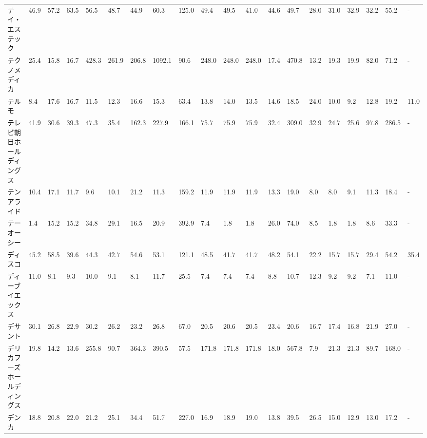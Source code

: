 \begin{tabular}{llllllllllllllllllll}
テイ・エス　テック       &   46.9 &   57.2 &      63.5 &      56.5 &       48.7 &    44.9 &    60.3 &    125.0 &    49.4 &    49.5 &   41.0 &   44.6 &    49.7 &    28.0 &    31.0 &   32.9 &   32.2 &    55.2 &      - \\
テクノメディカ         &   25.4 &   15.8 &      16.7 &     428.3 &      261.9 &   206.8 &  1092.1 &     90.6 &   248.0 &   248.0 &  248.0 &   17.4 &   470.8 &    13.2 &    19.3 &   19.9 &   82.0 &    71.2 &      - \\
テルモ             &    8.4 &   17.6 &      16.7 &      11.5 &       12.3 &    16.6 &    15.3 &     63.4 &    13.8 &    14.0 &   13.5 &   14.6 &    18.5 &    24.0 &    10.0 &    9.2 &   12.8 &    19.2 &   11.0 \\
テレビ朝日ホールディングス   &   41.9 &   30.6 &      39.3 &      47.3 &       35.4 &   162.3 &   227.9 &    166.1 &    75.7 &    75.9 &   75.9 &   32.4 &   309.0 &    32.9 &    24.7 &   25.6 &   97.8 &   286.5 &      - \\
テンアライド          &   10.4 &   17.1 &      11.7 &       9.6 &       10.1 &    21.2 &    11.3 &    159.2 &    11.9 &    11.9 &   11.9 &   13.3 &    19.0 &     8.0 &     8.0 &    9.1 &   11.3 &    18.4 &      - \\
テーオーシー          &    1.4 &   15.2 &      15.2 &      34.8 &       29.1 &    16.5 &    20.9 &    392.9 &     7.4 &     1.8 &    1.8 &   26.0 &    74.0 &     8.5 &     1.8 &    1.8 &    8.6 &    33.3 &      - \\
ディスコ            &   45.2 &   58.5 &      39.6 &      44.3 &       42.7 &    54.6 &    53.1 &    121.1 &    48.5 &    41.7 &   41.7 &   48.2 &    54.1 &    22.2 &    15.7 &   15.7 &   29.4 &    54.2 &   35.4 \\
ディーブイエックス       &   11.0 &    8.1 &       9.3 &      10.0 &        9.1 &     8.1 &    11.7 &     25.5 &     7.4 &     7.4 &    7.4 &    8.8 &    10.7 &    12.3 &     9.2 &    9.2 &    7.1 &    11.0 &      - \\
デサント            &   30.1 &   26.8 &      22.9 &      30.2 &       26.2 &    23.2 &    26.8 &     67.0 &    20.5 &    20.6 &   20.5 &   23.4 &    20.6 &    16.7 &    17.4 &   16.8 &   21.9 &    27.0 &      - \\
デリカフーズホールディングス  &   19.8 &   14.2 &      13.6 &     255.8 &       90.7 &   364.3 &   390.5 &     57.5 &   171.8 &   171.8 &  171.8 &   18.0 &   567.8 &     7.9 &    21.3 &   21.3 &   89.7 &   168.0 &      - \\
デンカ             &   18.8 &   20.8 &      22.0 &      21.2 &       25.1 &    34.4 &    51.7 &    227.0 &    16.9 &    18.9 &   19.0 &   13.8 &    39.5 &    26.5 &    15.0 &   12.9 &   13.0 &    17.2 &      - \\

\end{tabular}
